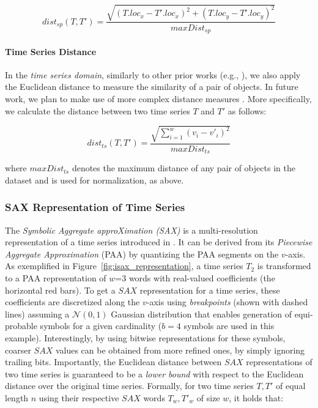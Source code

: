 \begin{equation} \label{eq:dist_sp}
dist_{sp}(T, T') = \frac{\sqrt{(T.loc_x - T'.loc_x)^2 + (T.loc_y - T'.loc_y)^2}}{maxDist_{sp}}
\end{equation} \label{eq:2}

\paragraph{Time Series Distance} In the {\em time series domain}, similarly to other prior works (e.g., \cite{shieh2008kdd}), we also apply the Euclidean distance to measure the similarity of a pair of objects. In future work, we plan to make use of more complex distance measures \cite{paparrizos2015k}. More specifically, we calculate the distance between two time series $T$ and $T'$ as follows:

\begin{equation} \label{eq:dist_ts}
dist_{ts}(T, T') = \frac{\sqrt{\displaystyle \sum_{i=1}^{w}(v_i - v'_i)^2}}{maxDist_{ts}}
\end{equation}

\noindent where $maxDist_{ts}$ denotes the maximum distance of any pair of objects in the dataset and is used for normalization, as above.

\subsubsection{SAX Representation of Time Series}
\label{subsec:sax}

The {\em Symbolic Aggregate approXimation (SAX)} is a multi-resolution representation of a time series introduced in \cite{shieh2008kdd}. It can be derived from its {\em Piecewise Aggregate Approximation} (PAA) \cite{keogh2001paa,faloutsos2000vldb} by quantizing the PAA segments on the $v$-axis. As exemplified in Figure~\ref{fig:isax_representation}, a time series $T_2$ is transformed to a PAA representation of $w$=3 words with real-valued coefficients (the horizontal red bars). To get a $SAX$ representation for a time series, these coefficients are discretized along the $v$-axis using {\em breakpoints} (shown with dashed lines) assuming a $\mathcal{N}(0,1)$ Gaussian distribution that enables generation of equi-probable symbols for a given cardinality ($b=4$ symbols are used in this example). Interestingly, by using bitwise representations for these symbols, coarser $SAX$ values can be obtained from more refined ones, by simply ignoring trailing bits. Importantly, the Euclidean distance between $SAX$ representations of two time series is guaranteed to be a {\em lower bound} with respect to the Euclidean distance over the original time series. Formally, for two time series $T, T'$ of equal length $n$ using their respective $SAX$ words $T_w, T'_w$ of size $w$, it holds that:

